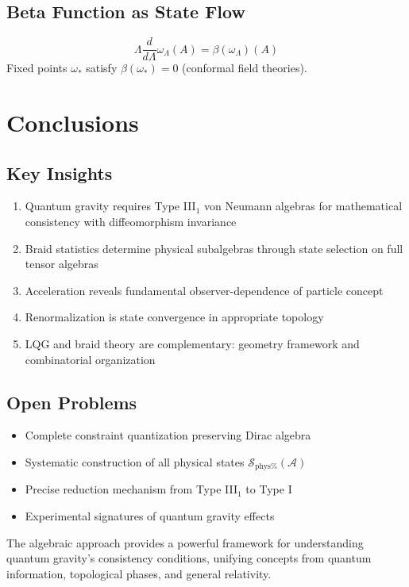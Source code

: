 \documentclass[aps,prl,reprint]{revtex4-2}
\begin{document}
\subsection{Beta Function as State Flow}

\begin{equation*}
\Lambda \frac{d}{d\Lambda} \omega_\Lambda(A) = \beta(\omega_\Lambda)(A) 
\end{equation*}
Fixed points $\omega_*$ satisfy $\beta(\omega_*) = 0$ (conformal field
theories).

\section{Conclusions}

\subsection{Key Insights}

\begin{enumerate}
\item Quantum gravity requires Type III$_1$ von Neumann algebras for
mathematical consistency with diffeomorphism invariance

\item Braid statistics determine physical subalgebras through state
selection on full tensor algebras

\item Acceleration reveals fundamental observer-dependence of particle
concept

\item Renormalization is state convergence in appropriate topology

\item LQG and braid theory are complementary: geometry framework and
combinatorial organization
\end{enumerate}

\subsection{Open Problems}

\begin{itemize}
\item Complete constraint quantization preserving Dirac algebra

\item Systematic construction of all physical states $\mathcal{S}_{\text{phys%
}}(\mathcal{A})$

\item Precise reduction mechanism from Type III$_1$ to Type I

\item Experimental signatures of quantum gravity effects
\end{itemize}

The algebraic approach provides a powerful framework for understanding
quantum gravity's consistency conditions, unifying concepts from quantum
information, topological phases, and general relativity.
\end{document}
